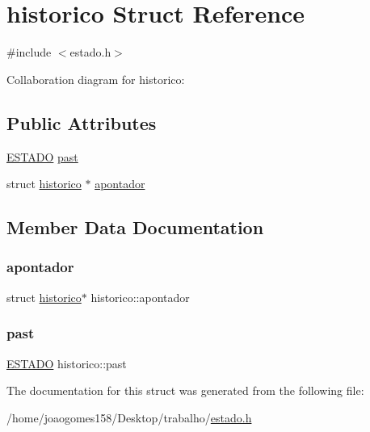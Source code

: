 \hypertarget{structhistorico}{}\section{historico Struct Reference}
\label{structhistorico}


{\ttfamily \#include $<$estado.\+h$>$}



Collaboration diagram for historico\+:
\subsection*{Public Attributes}
\begin{DoxyCompactItemize}
\item 
\hyperlink{estado_8h_a857f2529d823a22e6f4a81cf21fb810f}{E\+S\+T\+A\+DO} \hyperlink{structhistorico_abd15961b66da6e97cb59a0c8ed911c3c}{past}
\item 
struct \hyperlink{structhistorico}{historico} $\ast$ \hyperlink{structhistorico_ab3286a2833a630de1b869698584a06e2}{apontador}
\end{DoxyCompactItemize}


\subsection{Member Data Documentation}
\mbox{\label{structhistorico_ab3286a2833a630de1b869698584a06e2}} 
\subsubsection{\texorpdfstring{apontador}{apontador}}
{\footnotesize\ttfamily struct \hyperlink{structhistorico}{historico}$\ast$ historico\+::apontador}

\mbox{\label{structhistorico_abd15961b66da6e97cb59a0c8ed911c3c}} 
\subsubsection{\texorpdfstring{past}{past}}
{\footnotesize\ttfamily \hyperlink{estado_8h_a857f2529d823a22e6f4a81cf21fb810f}{E\+S\+T\+A\+DO} historico\+::past}



The documentation for this struct was generated from the following file\+:\begin{DoxyCompactItemize}
\item 
/home/joaogomes158/\+Desktop/trabalho/\hyperlink{estado_8h}{estado.\+h}\end{DoxyCompactItemize}
